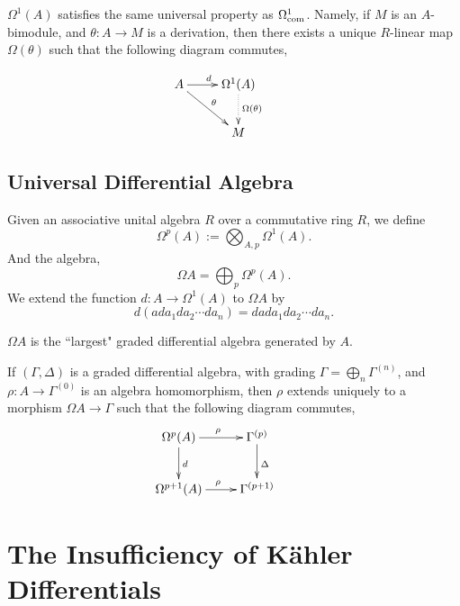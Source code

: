 $\Omega^1(A)$ satisfies the 
same universal property as $\Omega^1_{\operatorname{com}}$. Namely, if $M$ is an $A$-bimodule,
and $\theta:A\rightarrow M$ is a derivation, then there exists a unique $R$-linear
map $\Omega(\theta)$ such that the following diagram commutes,

    \begin{displaymath}
    \xymatrix{
        A \ar[r]^d \ar[rd]^\theta & 
        \Omega^1(A) \ar@{.>}[d]^{\Omega(\theta)} &\\
         &
        M
  } 
  \end{displaymath}
  
\subsection{Universal Differential Algebra}
Given an associative unital algebra $R$ over a commutative ring $R$,
we define
\begin{equation*}
    \Omega^p(A) := \bigotimes_{A,p} \Omega^1(A).
\end{equation*} 
And the algebra,
\begin{equation*}
    \Omega A = \bigoplus_{p} \Omega^p(A).
\end{equation*}
We extend the function $d:A\rightarrow \Omega^1(A)$ to $\Omega A$
by
\begin{equation*}
    d(ada_1da_2\cdots da_n) = dada_1da_2\cdots da_n.
\end{equation*}
 
\begin{theorem}
    $\Omega A$ is the ``largest" graded differential algebra generated by $A$. 
    
    If $(\Gamma,\Delta)$ is a graded differential algebra, with grading $\Gamma = \bigoplus_n \Gamma^{(n)}$,
    and $\rho:A\rightarrow \Gamma^{(0)}$ is an algebra homomorphism, then $\rho$
    extends uniquely to a morphism $\Omega A\rightarrow \Gamma$ such that the following
    diagram commutes,
    \begin{displaymath}
    \xymatrix{
        \Omega^p(A) \ar[r]^\rho \ar[d]^{d} & 
        \Gamma^{(p)} \ar[d]^\Delta&\\
        \Omega^{p+1}(A) \ar[r]^\rho & 
        \Gamma^{(p+1)}&
    }
    \end{displaymath}
\end{theorem}

\section*{The Insufficiency of K\"ahler Differentials}

